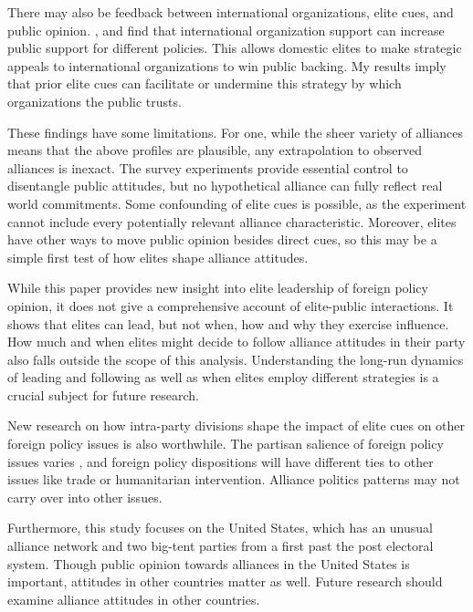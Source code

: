 \documentclass[12pt]{article}
\begin{document}
There may also be feedback between international organizations, elite cues, and public opinion.
\citet{Griecoetal2011}, \citet{Greenhill2020} and \citet{RecchiaChu2021} find that international organization support can increase public support for different policies. 
This allows domestic elites to make strategic appeals to international organizations to win public backing.
My results imply that prior elite cues can facilitate or undermine this strategy by which organizations the public trusts.


These findings have some limitations. 
For one, while the sheer variety of alliances means that the above profiles are plausible, any extrapolation to observed alliances is inexact. 
The survey experiments provide essential control to disentangle public attitudes, but no hypothetical alliance can fully reflect real world commitments.
Some confounding of elite cues is possible, as the experiment cannot include every potentially relevant alliance characteristic. 
Moreover, elites have other ways to move public opinion besides direct cues, so this may be a simple first test of how elites shape alliance attitudes. 


While this paper provides new insight into elite leadership of foreign policy opinion, it does not give a comprehensive account of elite-public interactions.
It shows that elites can lead, but not when, how and why they exercise influence. 
How much and when elites might decide to follow alliance attitudes in their party also falls outside the scope of this analysis. 
Understanding the long-run dynamics of leading and following as well as when elites employ different strategies is a crucial subject for future research. 


New research on how intra-party divisions shape the impact of elite cues on other foreign policy issues is also worthwhile. 
The partisan salience of foreign policy issues varies \citep{GuisingerSaunders2017}, and foreign policy dispositions will have different ties to other issues like trade or humanitarian intervention.
Alliance politics patterns may not carry over into other issues.


Furthermore, this study focuses on the United States, which has an unusual alliance network and two big-tent parties from a first past the post electoral system. 
Though public opinion towards alliances in the United States is important, attitudes in other countries matter as well. 
Future research should examine alliance attitudes in other countries. 
\end{document}
